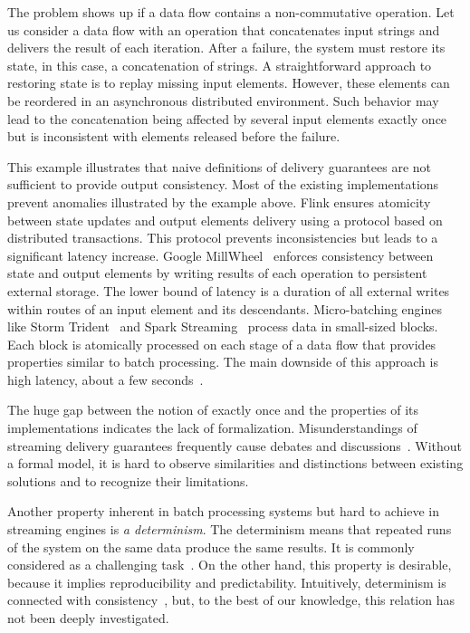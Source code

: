 The problem shows up if a data flow contains a non-commutative operation. Let us consider a data flow with an operation that concatenates input strings and delivers the result of each iteration. 
After a failure, the system must restore its state, in this case, a concatenation of strings. 
A straightforward approach to restoring state is to replay missing input elements. 
However, these elements can be reordered in an asynchronous distributed environment. 
Such behavior may lead to the concatenation being affected by several input elements exactly once but is inconsistent with elements released before the failure.

This example illustrates that naive definitions of delivery guarantees are not sufficient to provide output consistency. 
Most of the existing implementations prevent anomalies illustrated by the example above. Flink ensures atomicity between state updates and output elements delivery using a protocol based on distributed transactions. This protocol prevents inconsistencies but leads to a significant latency increase. 
Google MillWheel~\cite{Akidau:2013:MFS:2536222.2536229} enforces consistency between state and output elements by writing results of each operation to persistent external storage. 
The lower bound of latency is a duration of all external writes within routes of an input element and its descendants. 
Micro-batching engines like Storm Trident~\cite{apache:storm:trident} and Spark Streaming~\cite{Zaharia:2012:DSE:2342763.2342773} process data in small-sized blocks. 
Each block is atomically processed on each stage of a data flow that provides properties similar to batch processing.
 The main downside of this approach is high latency, about a few seconds~\cite{7530084, 7474816}.

The huge gap between the notion of exactly once and the properties of its implementations indicates the lack of formalization. Misunderstandings of streaming delivery guarantees frequently cause debates and discussions~\cite{JerryPengStreamIO, PaperTrail}. Without a formal model, it is hard to observe similarities and distinctions between existing solutions and to recognize their limitations.

Another property inherent in batch processing systems but hard to achieve in streaming engines is {\em a determinism}. 
The determinism means that repeated runs of the system on the same data produce the same results. It is commonly considered as a challenging task~\cite{Zacheilas:2017:MDS:3093742.3093921}. 
On the other hand, this property is desirable, because it implies reproducibility and predictability. 
Intuitively, determinism is connected with consistency~\cite{Stonebraker:2005:RRS:1107499.1107504}, but, to the best of our knowledge, this relation has not been deeply investigated. 

